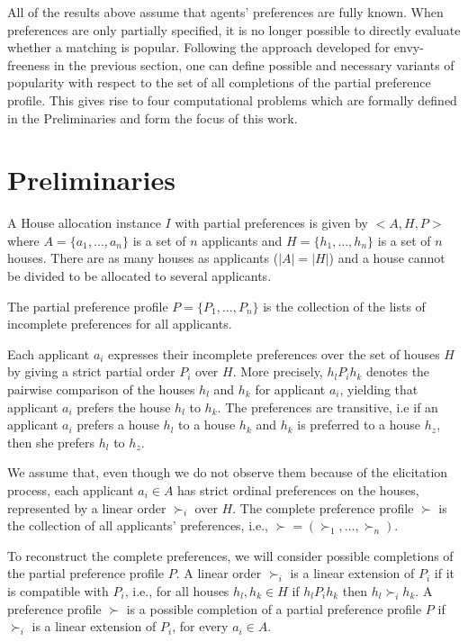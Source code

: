 \documentclass{article}
\newcommand{\agents}{A}
\newcommand{\objects}{H}
\begin{document}
All of the results above assume that agents' preferences are fully known. 
When preferences are only partially specified, it is no longer possible to directly evaluate whether a matching is popular. 
Following the approach developed for envy-freeness in the previous section, one can define possible and necessary variants of popularity with respect to the set of all completions of the partial preference profile. 
This gives rise to four computational problems which are formally defined in the Preliminaries and form the focus of this work.


\section{Preliminaries}

A House allocation instance $I$ with partial preferences is given by $<\agents, \objects, P>$ where $\agents=\{a_1, ..., a_n\}$ is a set of $n$ applicants and $\objects = \{h_1, ..., h_n\}$ is a set of $n$ houses. 
There are as many houses as applicants ($|\agents| = |\objects|$) and a house cannot be divided to be allocated to several applicants.

The partial preference profile $P=\{P_1, ..., P_n\}$ is the collection of the lists of incomplete preferences for all applicants. 

Each applicant $a_i$ expresses their incomplete preferences over the set of houses $\objects$ by giving a strict partial order $P_i$ over $\objects$. 
More precisely, $h_l P_i h_k$ denotes the pairwise comparison of the houses $h_l$ and $h_k$ for applicant $a_i$, yielding that applicant $a_i$ prefers the house $h_l$ to $h_k$.
The preferences are transitive, i.e if an applicant $a_i$ prefers a house $h_l$ to a house $h_k$ and $h_k$ is preferred to a house $h_z$, then she prefers $h_l$ to $h_z$.

We assume that, even though we do not observe them because of the elicitation process, each applicant $a_i \in \agents$ has strict ordinal preferences on the houses, represented by a linear order $\succ_i$ over $\objects$.
The complete preference profile $\succ$ is the collection of all applicants' preferences, i.e., $\succ=(\succ_1,\dots,\succ_n)$.

To reconstruct the complete preferences, we will consider possible completions of the partial preference profile $P$.
A linear order $\succ_i$ is a linear extension of $P_i$ if it is compatible with $P_i$, i.e., for all houses $h_l,h_k\in \objects$ if $h_l P_i h_k$ then $h_l \succ_i h_k$. 
A preference profile $\succ$ is a possible completion of a partial preference profile $P$ if $\succ_i$ is a linear extension of $P_i$, for every $a_i\in \agents$.
\end{document}
